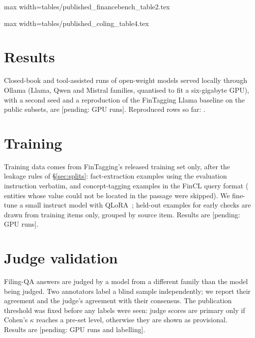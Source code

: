 \documentclass[10pt,twocolumn,a4paper]{article}
\makeatletter
\newcommand{\pending}[1]{\textcolor{red!70!black}{[pending: #1]}}
\newcommand{\tabinput}[1]{\@@input #1 }
\makeatother
\begin{document}
\begin{table}[t]\centering\small
\caption{Published FinanceBench results (\% correct)~\cite{islam2023financebench}.}\label{tab:pub-financebench}
\begin{adjustbox}{max width=\columnwidth}\tabinput{tables/published_financebench_table2.tex}\end{adjustbox}
\end{table}

\begin{table}[t]\centering\small
\caption{Published COLING XBRL scores (\%)~\cite{wang2025regulations}.}\label{tab:pub-coling}
\begin{adjustbox}{max width=\columnwidth}\tabinput{tables/published_coling_table4.tex}\end{adjustbox}
\end{table}

\section{Results}
Closed-book and tool-assisted runs of open-weight models served locally through Ollama (Llama, Qwen
and Mistral families, quantised to fit a six-gigabyte GPU), with a second seed and a reproduction of
the FinTagging Llama baseline on the public subsets, are \pending{GPU runs}. Reproduced rows so far:
\nReproducedRows.

\section{Training}
Training data comes from FinTagging's released training set only, after the leakage rules of
\S\ref{sec:splits}: \nSftFinni{} fact-extraction examples using the evaluation instruction verbatim,
and \nSftFincl{} concept-tagging examples in the FinCL query format (\nSftNoContext{} entities whose
value could not be located in the passage were skipped). We fine-tune a small instruct model with
QLoRA~\cite{dettmers2023qlora}; held-out examples for early checks are drawn from training items only,
grouped by source item. Results are \pending{GPU runs}.

\section{Judge validation}\label{sec:judge}
Filing-QA answers are judged by a model from a different family than the model being judged. Two
annotators label a blind sample independently; we report their agreement and the judge's agreement
with their consensus. The publication threshold was fixed before any labels were seen: judge scores
are primary only if Cohen's $\kappa$ reaches a pre-set level, otherwise they are shown as
provisional. Results are \pending{GPU runs and labelling}.
\end{document}
